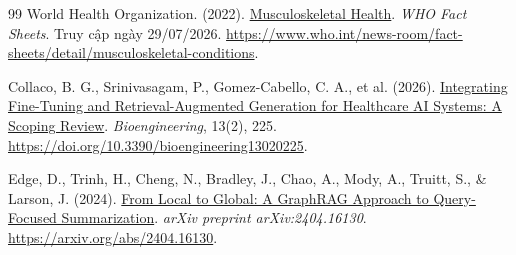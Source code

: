 \begin{thebibliography}{99}
World Health Organization. (2022).
\href{https://www.who.int/news-room/fact-sheets/detail/musculoskeletal-conditions}{Musculoskeletal Health}.
\textit{WHO Fact Sheets}. Truy cập ngày 29/07/2026.
\url{https://www.who.int/news-room/fact-sheets/detail/musculoskeletal-conditions}.

Collaco, B. G., Srinivasagam, P., Gomez-Cabello, C. A., et al. (2026).
\href{https://doi.org/10.3390/bioengineering13020225}{Integrating Fine-Tuning and Retrieval-Augmented Generation for Healthcare AI Systems: A Scoping Review}.
\textit{Bioengineering}, 13(2), 225. \url{https://doi.org/10.3390/bioengineering13020225}.

Edge, D., Trinh, H., Cheng, N., Bradley, J., Chao, A., Mody, A., Truitt, S., \& Larson, J. (2024).
\href{https://arxiv.org/abs/2404.16130}{From Local to Global: A GraphRAG Approach to Query-Focused Summarization}.
\textit{arXiv preprint arXiv:2404.16130}. \url{https://arxiv.org/abs/2404.16130}.

\end{thebibliography}